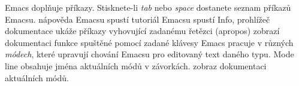 Emacs doplňuje příkazy. Stisknete-li  {\it tab\/} nebo {\it
space\/} dostanete seznam příkazů Emacsu.
\askip
{} nápověda Emacsu
 spustí tutoriál Emacsu
 spustí Info, prohlížeč dokumentace
 ukáže příkazy vyhovující zadanému řetězci (apropos)
 zobrazí dokumentaci funkce spuštěné pomocí zadané klávesy
\askip
Emacs pracuje v různých {\it módech}, které upravují chování
Emacsu pro editovaný text daného typu. Mode line obsahuje jména aktuálních
módů v závorkách.
\askip
{} zobraz dokumentaci aktuálních módů.

\copyrightnotice

\bye

